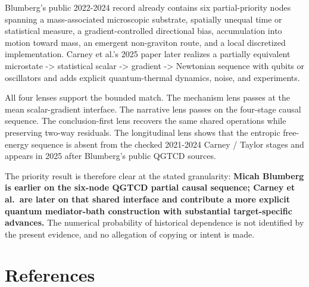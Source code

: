 \documentclass[
  american,
  11pt,
  letterpaper,
]{article}
\begin{document}
Blumberg's public 2022-2024 record already contains six partial-priority nodes spanning a mass-associated microscopic substrate, spatially unequal time or statistical measure, a gradient-controlled directional bias, accumulation into motion toward mass, an emergent non-graviton route, and a local discretized implementation. Carney et al.'s 2025 paper later realizes a partially equivalent microstate -\textgreater{} statistical scalar -\textgreater{} gradient -\textgreater{} Newtonian sequence with qubits or oscillators and adds explicit quantum-thermal dynamics, noise, and experiments.

All four lenses support the bounded match. The mechanism lens passes at the mean scalar-gradient interface. The narrative lens passes on the four-stage causal sequence. The conclusion-first lens recovers the same shared operations while preserving two-way residuals. The longitudinal lens shows that the entropic free-energy sequence is absent from the checked 2021-2024 Carney / Taylor stages and appears in 2025 after Blumberg's public QGTCD sources.

The priority result is therefore clear at the stated granularity: \textbf{Micah Blumberg is earlier on the six-node QGTCD partial causal sequence; Carney et al.~are later on that shared interface and contribute a more explicit quantum mediator-bath construction with substantial target-specific advances.} The numerical probability of historical dependence is not identified by the present evidence, and no allegation of copying or intent is made.

\section{References}\label{references}
\end{document}
